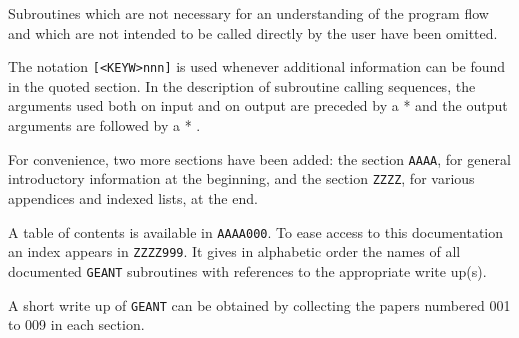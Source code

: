 Subroutines which are not necessary for an understanding of
the program flow and which are not intended to be called directly by
the user have been omitted.

The notation {\tt [<KEYW>nnn]} is used whenever
additional information can be found in the quoted section.
In the description of subroutine calling sequences,
the arguments used both on input and on output
are preceded by a * and the output arguments are followed by a * .

For convenience, two more sections have been added:
the section {\tt AAAA}, for general introductory information
at the beginning, and
the section {\tt ZZZZ}, for various appendices and indexed lists, at
the end.

A table of contents is available in {\tt AAAA000}.
To ease access to this documentation an index
appears in {\tt ZZZZ999}. It gives in alphabetic order the names of all
documented {\tt GEANT} subroutines with references
to the appropriate write up(s).

A short write up of {\tt GEANT} can be obtained by collecting the papers
numbered 001 to 009 in each section.
 
